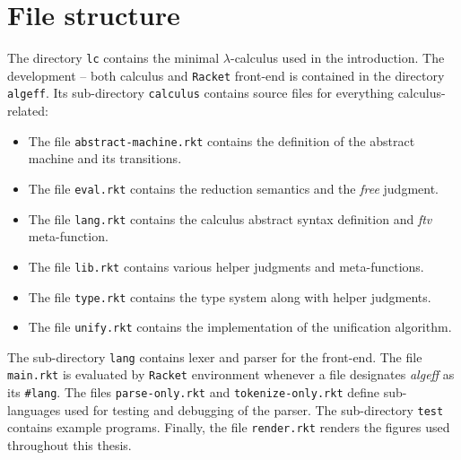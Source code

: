 \documentclass[inz, english, longabstract]{iithesis}
\newcommand{\Racket}{\texttt{Racket}}
\newcommand{\LC}{\(\lambda\)-calculus}
\begin{document}
\section{File structure}\label{sec:file-structure}
The directory \texttt{lc} contains the minimal \LC{} used in the introduction.
The development -- both calculus and \Racket{} front-end is contained in the directory \texttt{algeff}.
Its sub-directory \texttt{calculus} contains source files for everything calculus-related:
\begin{itemize}
  \item The file \texttt{abstract-machine.rkt} contains the definition of the abstract machine and its transitions.
  \item The file \texttt{eval.rkt} contains the reduction semantics and the \emph{free} judgment.
  \item The file \texttt{lang.rkt} contains the calculus abstract syntax definition and \emph{ftv} meta-function.
  \item The file \texttt{lib.rkt} contains various helper judgments and meta-functions.
  \item The file \texttt{type.rkt} contains the type system along with helper judgments.
  \item The file \texttt{unify.rkt} contains the implementation of the unification algorithm.
\end{itemize}
The sub-directory \texttt{lang} contains lexer and parser for the front-end.
The file \texttt{main.rkt} is evaluated by \Racket{} environment whenever a file designates \emph{algeff} as its \texttt{\#lang}.
The files \texttt{parse-only.rkt} and \texttt{tokenize-only.rkt} define sub-languages used for testing and debugging of the parser.
The sub-directory \texttt{test} contains example programs.
Finally, the file \texttt{render.rkt} renders the figures used throughout this thesis.
\end{document}
